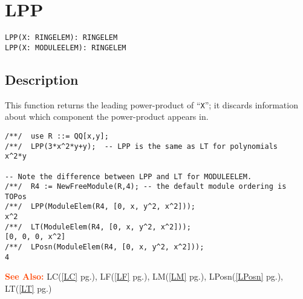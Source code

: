 \documentclass[a4paper]{mybook}
\newenvironment{command}{}{} %
\newcommand\SeeAlso{\par\textcolor{OrangeRed}{\textbf{\large See Also: }}}
\begin{document}
\section{LPP}
\label{LPP}
\begin{command} %


\begin{Verbatim}[label=syntax, rulecolor=\color{MidnightBlue},
frame=single]
LPP(X: RINGELEM): RINGELEM
LPP(X: MODULEELEM): RINGELEM
\end{Verbatim}


\subsection*{Description}

This function returns the leading power-product of ``\verb&X&''; it discards
information about which component the power-product appears in.
\begin{Verbatim}[label=example, rulecolor=\color{PineGreen}, frame=single]
/**/  use R ::= QQ[x,y];
/**/  LPP(3*x^2*y+y);  -- LPP is the same as LT for polynomials
x^2*y

-- Note the difference between LPP and LT for MODULEELEM.
/**/  R4 := NewFreeModule(R,4); -- the default module ordering is TOPos
/**/  LPP(ModuleElem(R4, [0, x, y^2, x^2]));
x^2
/**/  LT(ModuleElem(R4, [0, x, y^2, x^2]));
[0, 0, 0, x^2]
/**/  LPosn(ModuleElem(R4, [0, x, y^2, x^2]));
4
\end{Verbatim}


\SeeAlso %
  LC(\ref{LC} pg.\pageref{LC}), 
    LF(\ref{LF} pg.\pageref{LF}), 
    LM(\ref{LM} pg.\pageref{LM}), 
    LPosn(\ref{LPosn} pg.\pageref{LPosn}), 
    LT(\ref{LT} pg.\pageref{LT})
\end{command} %
\end{document}
